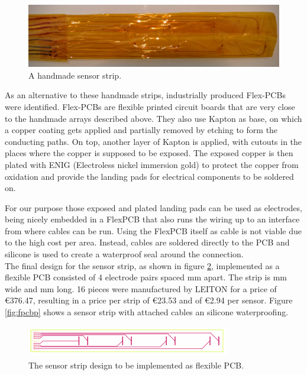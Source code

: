 \begin{figure}
	\begin{center}
		\includegraphics[width=\textwidth]{images/v2.jpg} 
		\caption{A handmade sensor strip.}
		\label{fig:v2}
	\end{center}
\end{figure}

As an alternative to these handmade strips, industrially produced Flex-PCBs were identified. Flex-PCBs are flexible printed circuit boards that are very close to the handmade arrays described above. They also use Kapton as base, on which a copper coating gets applied and partially removed by etching to form the conducting paths. On top, another layer of Kapton is applied, with cutouts in the places where the copper is supposed to be exposed. The exposed copper is then plated with ENIG (Electroless nickel immersion gold) to protect the copper from oxidation and provide the landing pads for electrical components to be soldered on.

For our purpose those exposed and plated landing pads can be used as electrodes, being nicely embedded in a FlexPCB that also runs the wiring up to an interface from where cables can be run. Using the FlexPCB itself as cable is not viable due to the high cost per area. Instead, cables are soldered directly to the PCB and silicone is used to create a waterproof seal around the connection.\\

The final design for the sensor strip, as shown in figure \ref{fig:fpcbd}, implemented as a flexible PCB consisted of 4 electrode pairs spaced \unit[50]{mm} apart. The strip is \unit[25]{mm} wide and \unit[220]{mm} long. 16 pieces were manufactured by LEITON for a price of \euro{376.47}, resulting in a price per strip of \euro{23.53} and of \euro{2.94} per sensor. Figure \ref{fig:fpcbp} shows a sensor strip with attached cables an silicone waterproofing.

\begin{figure}
	\begin{center}
		\includegraphics[width=\textwidth]{images/fpcbd.pdf} 
		\caption{The sensor strip design to be implemented as flexible PCB.}
		\label{fig:fpcbd}
	\end{center}
\end{figure}

